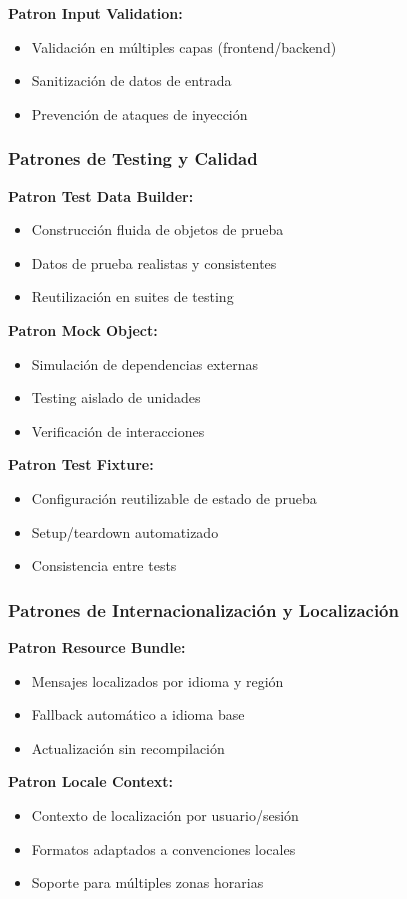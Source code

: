 \textbf{Patron Input Validation:}
\begin{itemize}
\item Validación en múltiples capas (frontend/backend)
\item Sanitización de datos de entrada
\item Prevención de ataques de inyección
\end{itemize}

\subsubsection{Patrones de Testing y Calidad}

\textbf{Patron Test Data Builder:}
\begin{itemize}
\item Construcción fluida de objetos de prueba
\item Datos de prueba realistas y consistentes
\item Reutilización en suites de testing
\end{itemize}

\textbf{Patron Mock Object:}
\begin{itemize}
\item Simulación de dependencias externas
\item Testing aislado de unidades
\item Verificación de interacciones
\end{itemize}

\textbf{Patron Test Fixture:}
\begin{itemize}
\item Configuración reutilizable de estado de prueba
\item Setup/teardown automatizado
\item Consistencia entre tests
\end{itemize}

\subsubsection{Patrones de Internacionalización y Localización}

\textbf{Patron Resource Bundle:}
\begin{itemize}
\item Mensajes localizados por idioma y región
\item Fallback automático a idioma base
\item Actualización sin recompilación
\end{itemize}

\textbf{Patron Locale Context:}
\begin{itemize}
\item Contexto de localización por usuario/sesión
\item Formatos adaptados a convenciones locales
\item Soporte para múltiples zonas horarias
\end{itemize}